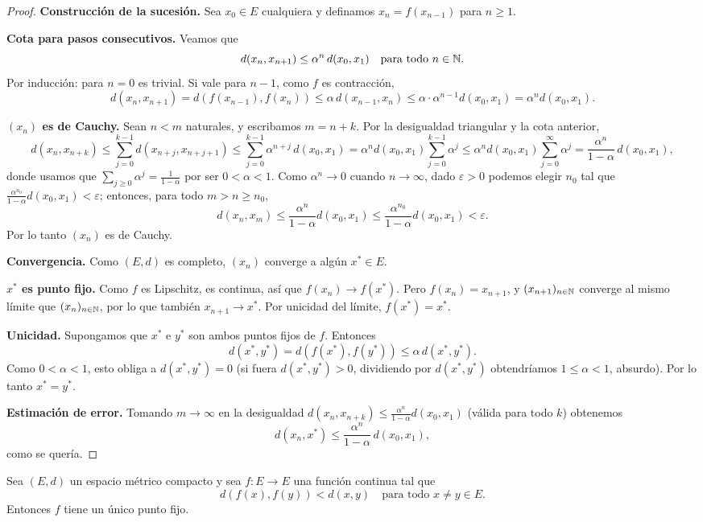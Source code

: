 \begin{proof}
\textbf{Construcción de la sucesión.} Sea $x_0\in E$ cualquiera y
definamos $x_n = f(x_{n-1})$ para $n\ge 1$.

\textbf{Cota para pasos consecutivos.} Veamos que
\[
d(x_n,x_{n+1}) \le \alpha^n\, d(x_0,x_1) \quad \text{para todo } n\in\mathbb{N}.
\]
Por inducción: para $n=0$ es trivial. Si vale para $n-1$, como $f$ es
contracción,
\[
d(x_n,x_{n+1}) = d(f(x_{n-1}),f(x_n)) \le \alpha\, d(x_{n-1},x_n)
\le \alpha \cdot \alpha^{n-1} d(x_0,x_1) = \alpha^n d(x_0,x_1).
\]

\textbf{$(x_n)$ es de Cauchy.} Sean $n<m$ naturales, y escribamos
$m=n+k$. Por la desigualdad triangular y la cota anterior,
\[
d(x_n,x_{n+k}) \le \sum_{j=0}^{k-1} d(x_{n+j},x_{n+j+1})
\le \sum_{j=0}^{k-1} \alpha^{n+j}\, d(x_0,x_1)
= \alpha^n d(x_0,x_1) \sum_{j=0}^{k-1} \alpha^j
\le \alpha^n d(x_0,x_1) \sum_{j=0}^{\infty} \alpha^j
= \frac{\alpha^n}{1-\alpha}\, d(x_0,x_1),
\]
donde usamos que $\sum_{j\ge0}\alpha^j = \frac{1}{1-\alpha}$ por ser
$0<\alpha<1$. Como $\alpha^n \to 0$ cuando $n\to\infty$, dado
$\varepsilon>0$ podemos elegir $n_0$ tal que
$\frac{\alpha^{n_0}}{1-\alpha} d(x_0,x_1) < \varepsilon$; entonces, para
todo $m>n\ge n_0$,
\[
d(x_n,x_m) \le \frac{\alpha^n}{1-\alpha} d(x_0,x_1)
\le \frac{\alpha^{n_0}}{1-\alpha} d(x_0,x_1) < \varepsilon.
\]
Por lo tanto $(x_n)$ es de Cauchy.

\textbf{Convergencia.} Como $(E,d)$ es completo, $(x_n)$ converge a algún
$x^*\in E$.

\textbf{$x^*$ es punto fijo.} Como $f$ es Lipschitz, es continua, así
que $f(x_n)\to f(x^*)$. Pero $f(x_n)=x_{n+1}$, y $(x_{n+1})_{n\in\mathbb{N}}$
converge al mismo límite que $(x_n)_{n\in\mathbb{N}}$, por lo que también
$x_{n+1}\to x^*$. Por unicidad del límite, $f(x^*)=x^*$.

\textbf{Unicidad.} Supongamos que $x^*$ e $y^*$ son ambos puntos fijos de
$f$. Entonces
\[
d(x^*,y^*) = d(f(x^*),f(y^*)) \le \alpha\, d(x^*,y^*).
\]
Como $0<\alpha<1$, esto obliga a $d(x^*,y^*)=0$ (si fuera $d(x^*,y^*)>0$,
dividiendo por $d(x^*,y^*)$ obtendríamos $1\le\alpha<1$, absurdo). Por lo
tanto $x^*=y^*$.

\textbf{Estimación de error.} Tomando $m\to\infty$ en la desigualdad
$d(x_n,x_{n+k})\le \frac{\alpha^n}{1-\alpha}d(x_0,x_1)$ (válida para todo
$k$) obtenemos
\[
d(x_n,x^*) \le \frac{\alpha^n}{1-\alpha}\, d(x_0,x_1),
\]
como se quería.
\end{proof}

\begin{teo}
Sea $(E,d)$ un espacio métrico compacto y sea $f : E \to E$ una función
continua tal que
\[
d(f(x),f(y)) < d(x,y) \quad \text{para todo } x\neq y \in E.
\]
Entonces $f$ tiene un único punto fijo.
\end{teo}

